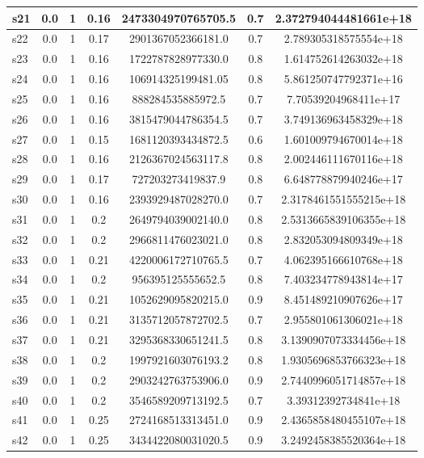 \documentclass{article}
\begin{document}
\begin{tabular}{|l|c|c|c|c|c|c|}
\hline
s21 &0.0 & 1 & 0.16 & 2473304970765705.5 & 0.7 & 2.372794044481661e+18\\
\hline
s22 &0.0 & 1 & 0.17 & 2901367052366181.0 & 0.7 & 2.789305318575554e+18\\
\hline
s23 &0.0 & 1 & 0.16 & 1722787828977330.0 & 0.8 & 1.614752614263032e+18\\
\hline
s24 &0.0 & 1 & 0.16 & 106914325199481.05 & 0.8 & 5.861250747792371e+16\\
\hline
s25 &0.0 & 1 & 0.16 & 888284535885972.5 & 0.7 & 7.70539204968411e+17\\
\hline
s26 &0.0 & 1 & 0.16 & 3815479044786354.5 & 0.7 & 3.749136963458329e+18\\
\hline
s27 &0.0 & 1 & 0.15 & 1681120393434872.5 & 0.6 & 1.601009794670014e+18\\
\hline
s28 &0.0 & 1 & 0.16 & 2126367024563117.8 & 0.8 & 2.002446111670116e+18\\
\hline
s29 &0.0 & 1 & 0.17 & 727203273419837.9 & 0.8 & 6.648778879940246e+17\\
\hline
s30 &0.0 & 1 & 0.16 & 2393929487028270.0 & 0.7 & 2.3178461551555215e+18\\
\hline
s31 &0.0 & 1 & 0.2 & 2649794039002140.0 & 0.8 & 2.5313665839106355e+18\\
\hline
s32 &0.0 & 1 & 0.2 & 2966811476023021.0 & 0.8 & 2.832053094809349e+18\\
\hline
s33 &0.0 & 1 & 0.21 & 4220006172710765.5 & 0.7 & 4.062395166610768e+18\\
\hline
s34 &0.0 & 1 & 0.2 & 956395125555652.5 & 0.8 & 7.403234778943814e+17\\
\hline
s35 &0.0 & 1 & 0.21 & 1052629095820215.0 & 0.9 & 8.451489210907626e+17\\
\hline
s36 &0.0 & 1 & 0.21 & 3135712057872702.5 & 0.7 & 2.955801061306021e+18\\
\hline
s37 &0.0 & 1 & 0.21 & 3295368330651241.5 & 0.8 & 3.1390907073334456e+18\\
\hline
s38 &0.0 & 1 & 0.2 & 1997921603076193.2 & 0.8 & 1.9305696853766323e+18\\
\hline
s39 &0.0 & 1 & 0.2 & 2903242763753906.0 & 0.9 & 2.7440996051714857e+18\\
\hline
s40 &0.0 & 1 & 0.2 & 3546589209713192.5 & 0.7 & 3.39312392734841e+18\\
\hline
s41 &0.0 & 1 & 0.25 & 2724168513313451.0 & 0.9 & 2.4365858480455107e+18\\
\hline
s42 &0.0 & 1 & 0.25 & 3434422080031020.5 & 0.9 & 3.2492458385520364e+18\\

\end{tabular}
\end{document}
